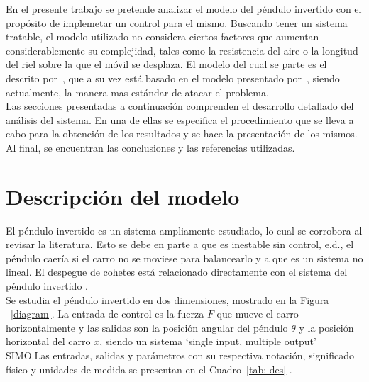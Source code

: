 \documentclass[journal]{IEEEtran}
\begin{document}
En el presente trabajo se pretende analizar
el modelo del péndulo invertido con el propósito de implemetar un control para el mismo. Buscando tener un sistema tratable, el modelo utilizado no considera ciertos factores que aumentan considerablemente su complejidad, tales como la resistencia del aire o la longitud del riel sobre la que el móvil se desplaza. El modelo del cual se parte es el descrito por~\cite{pag}, que a su vez está basado en el modelo presentado por~\cite{Siebert86}, siendo actualmente, la manera mas estándar de atacar el problema.\\

Las secciones presentadas a continuación comprenden el desarrollo detallado del análisis del sistema. En una de ellas se especifica el procedimiento que se lleva a cabo para la obtención de los resultados y se hace la presentación de los mismos. Al final, se encuentran las conclusiones y las referencias utilizadas. 



\section{Descripción del modelo\label{sec:descripcion}}
El péndulo invertido es un sistema ampliamente estudiado, lo cual se corrobora al revisar la literatura. Esto se debe en parte a que es inestable sin control, e.d., el péndulo caería si el carro no se moviese para balancearlo y a que es un sistema no lineal. El despegue de cohetes está relacionado directamente con el sistema del péndulo invertido \cite{pag}.\\

Se estudia el péndulo invertido en dos dimensiones, mostrado en la Figura ~\ref{diagram}. La entrada de control es la fuerza $F$ que mueve el carro horizontalmente y las salidas son la posición angular del péndulo $\theta$ y la posición horizontal del carro $x$, siendo un sistema `single input, multiple output' SIMO.\@ Las entradas, salidas y parámetros con su respectiva notación, significado físico y unidades de medida se presentan en el Cuadro~\ref{tab: des} \cite{pag}.
\end{document}
